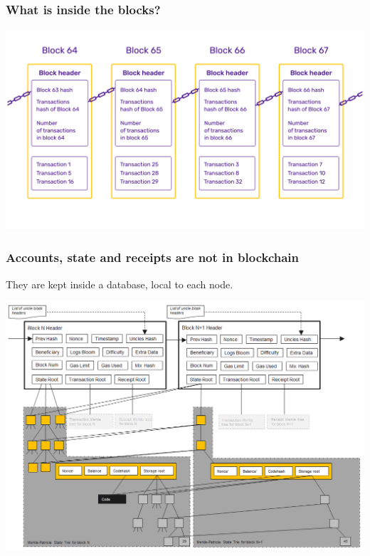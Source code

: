 \documentclass[11pt]{beamer}  %
\begin{document}
\begin{frame}\frametitle{What is inside the blocks?}

  \begin{center}
    \includegraphics[width=\textwidth,clip=false]{pictures/inside-blocks.jpg}
  \end{center}

\end{frame}

\begin{frame}\frametitle{Accounts, state and receipts are \alert{not} in blockchain}

  They are kept inside a database, local to each node.

  \begin{center}
    \includegraphics[scale=0.38,clip=false]{pictures/accounts-state-receipts.png}
  \end{center}

\end{frame}
\end{document}
